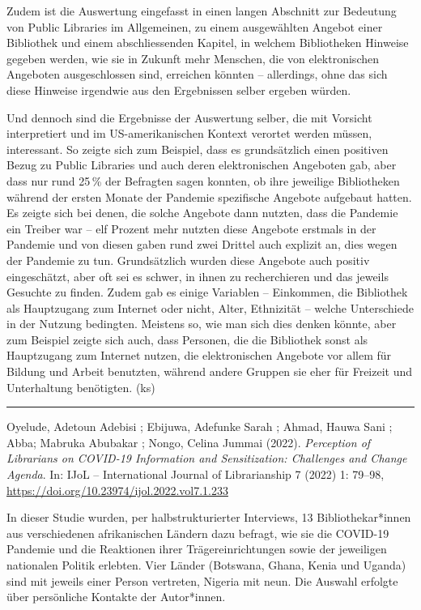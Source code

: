 \documentclass[a4paper,
fontsize=11pt,
oneside,
numbers=noperiodatend,
parskip=half-,
bibliography=totoc,
final
]{scrartcl}
\begin{document}
Zudem ist die Auswertung eingefasst in einen langen Abschnitt zur
Bedeutung von Public Libraries im Allgemeinen, zu einem ausgewählten
Angebot einer Bibliothek und einem abschliessenden Kapitel, in welchem
Bibliotheken Hinweise gegeben werden, wie sie in Zukunft mehr Menschen,
die von elektronischen Angeboten ausgeschlossen sind, erreichen könnten
-- allerdings, ohne das sich diese Hinweise irgendwie aus den
Ergebnissen selber ergeben würden.

Und dennoch sind die Ergebnisse der Auswertung selber, die mit Vorsicht
interpretiert und im US-amerikanischen Kontext verortet werden müssen,
interessant. So zeigte sich zum Beispiel, dass es grundsätzlich einen
positiven Bezug zu Public Libraries und auch deren elektronischen
Angeboten gab, aber dass nur rund 25\,\% der Befragten sagen konnten, ob
ihre jeweilige Bibliotheken während der ersten Monate der Pandemie
spezifische Angebote aufgebaut hatten. Es zeigte sich bei denen, die
solche Angebote dann nutzten, dass die Pandemie ein Treiber war -- elf
Prozent mehr nutzten diese Angebote erstmals in der Pandemie und von
diesen gaben rund zwei Drittel auch explizit an, dies wegen der Pandemie
zu tun. Grundsätzlich wurden diese Angebote auch positiv eingeschätzt,
aber oft sei es schwer, in ihnen zu recherchieren und das jeweils
Gesuchte zu finden. Zudem gab es einige Variablen -- Einkommen, die
Bibliothek als Hauptzugang zum Internet oder nicht, Alter, Ethnizität --
welche Unterschiede in der Nutzung bedingten. Meistens so, wie man sich
dies denken könnte, aber zum Beispiel zeigte sich auch, dass Personen,
die die Bibliothek sonst als Hauptzugang zum Internet nutzen, die
elektronischen Angebote vor allem für Bildung und Arbeit benutzten,
während andere Gruppen sie eher für Freizeit und Unterhaltung
benötigten. (ks)

\begin{center}\rule{0.5\linewidth}{0.5pt}\end{center}

\pagebreak
Oyelude, Adetoun Adebisi ; Ebijuwa, Adefunke Sarah ; Ahmad, Hauwa Sani ;
Abba; Mabruka Abubakar ; Nongo, Celina Jummai (2022). \emph{Perception
of Librarians on COVID-19 Information and Sensitization: Challenges and
Change Agenda}. In: IJoL -- International Journal of Librarianship 7
(2022) 1: 79--98, \url{https://doi.org/10.23974/ijol.2022.vol7.1.233}

In dieser Studie wurden, per halbstrukturierter Interviews, 13
Bibliothekar*innen aus verschiedenen afrikanischen Ländern dazu befragt,
wie sie die COVID-19 Pandemie und die Reaktionen ihrer
Trägereinrichtungen sowie der jeweiligen nationalen Politik erlebten.
Vier Länder (Botswana, Ghana, Kenia und Uganda) sind mit jeweils einer
Person vertreten, Nigeria mit neun. Die Auswahl erfolgte über
persönliche Kontakte der Autor*innen.
\end{document}

